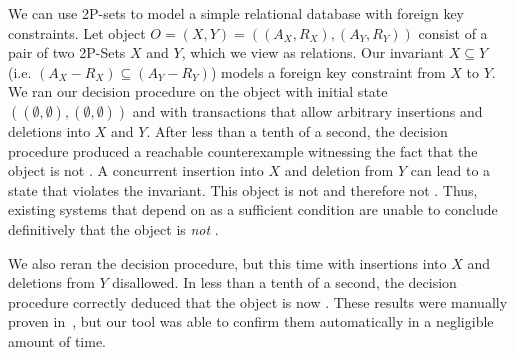 We can use 2P-sets to model a simple relational database with foreign key
constraints. Let object $O = (X, Y) = ((A_X, R_X), (A_Y, R_Y))$ consist of a
pair of two 2P-Sets $X$ and $Y$, which we view as relations. Our invariant $X
\subseteq Y$ (i.e. $(A_X - R_X) \subseteq (A_Y - R_Y)$) models a foreign key
constraint from $X$ to $Y$. We ran our decision procedure on the object with
initial state $((\emptyset, \emptyset), (\emptyset, \emptyset))$ and with
transactions that allow arbitrary insertions and deletions into $X$ and $Y$.
After less than a tenth of a second, the decision procedure produced a
reachable counterexample witnessing the fact that the object is not
\invariantconfluent{}. A concurrent insertion into $X$ and deletion from $Y$
can lead to a state that violates the invariant. This object is not
\invariantconfluent{} and therefore not \invariantclosed{}.
Thus, existing systems that depend on \invariantclosure{} as a sufficient
condition are unable to conclude definitively that the object is \emph{not}
\invariantconfluent{}.

We also reran the decision procedure, but this time with insertions into $X$
and deletions from $Y$ disallowed. In less than a tenth of a second, the
decision procedure correctly deduced that the object is now
\invariantconfluent{}. These results were manually proven
in~\cite{bailis2014coordination}, but our tool was able to confirm them
automatically in a negligible amount of time.

%

